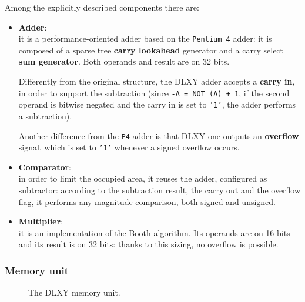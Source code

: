 Among the explicitly described components there are:
\begin{itemize}
	\item \textbf{Adder}: \\
		it is a performance-oriented adder based on the \texttt{Pentium 4}
		adder: it is composed of a sparse tree \textbf{carry lookahead}
		generator and a carry select \textbf{sum generator}.
		Both operands and result are on 32 bits.

		Differently from the original structure, the DLXY adder accepts
		a \textbf{carry in}, in order to support the subtraction
		(since \texttt{-A = NOT (A) + 1}, if the second operand is
		bitwise negated and the carry in is set to \texttt{'1'}, the adder
		performs a subtraction).

		Another difference from the \texttt{P4} adder is that DLXY one
		outputs an \textbf{overflow} signal, which is set to \texttt{'1'}
		whenever a signed overflow occurs.
	\item \textbf{Comparator}: \\
		in order to limit the occupied area, it reuses the adder,
		configured as subtractor: according to the subtraction result,
		the carry out and the overflow flag, it performs any magnitude
		comparison, both signed and unsigned.
	\item \textbf{Multiplier}: \\
		it is an implementation of the Booth algorithm.
		Its operands are on 16 bits and its result is on 32 bits: thanks
		to this sizing, no overflow is possible.
\end{itemize}

\subsubsection{Memory unit}
\begin{figure}[H]
	\centering
	\caption{The DLXY memory unit.}
	\label{fig:memory_unit}
\end{figure}

